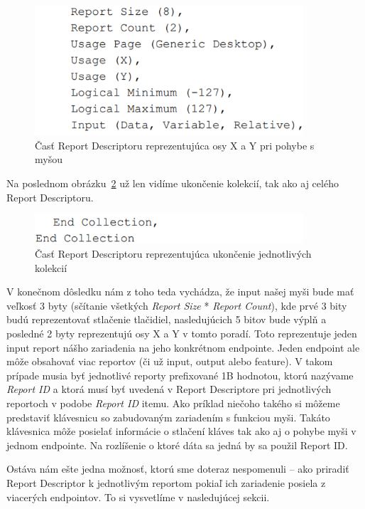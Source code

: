\begin{figure}[!htb]
	\centering
	\includegraphics[width=10cm]{img/kap03_report_desc_axis}
	\caption{Časť Report Descriptoru reprezentujúca osy X a Y pri pohybe s myšou}
	\label{obr:kap3:report_desc_axis}
\end{figure}

Na poslednom obrázku~\ref{obr:kap3:report_desc_end} už len vidíme ukončenie kolekcií, tak ako aj celého Report Descriptoru.

\begin{figure}[!htb]
	\centering
	\includegraphics[width=10cm]{img/kap03_report_desc_end}
	\caption{Časť Report Descriptoru reprezentujúca ukončenie jednotlivých kolekcií}
	\label{obr:kap3:report_desc_end}
\end{figure}

V konečnom dôsledku nám z toho teda vychádza, že input našej myši bude mať veľkosť 3 byty (sčítanie všetkých \textit{Report Size} * \textit{Report Count}), kde prvé 3 bity budú reprezentovať stlačenie tlačidiel, nasledujúcich 5 bitov bude výplň a posledné 2 byty reprezentujú osy X a Y v tomto poradí. Toto reprezentuje jeden input report nášho zariadenia na jeho konkrétnom endpointe. Jeden endpoint ale môže obsahovať viac reportov (či už input, output alebo feature). V takom prípade musia byť jednotlivé reporty prefixované 1B hodnotou, ktorú nazývame \textit{Report ID} a ktorá musí byť uvedená v Report Descriptore pri jednotlivých reportoch v podobe \textit{Report ID} itemu. Ako príklad niečoho takého si môžeme predstaviť klávesnicu so zabudovaným zariadením s funkciou myši. Takáto klávesnica môže posielať informácie o stlačení kláves tak ako aj o pohybe myši v jednom endpointe. Na rozlíšenie o ktoré dáta sa jedná by sa použil Report ID.

Ostáva nám ešte jedna možnosť, ktorú sme doteraz nespomenuli -- ako priradiť Report Descriptor k jednotlivým reportom pokiaľ ich zariadenie posiela z viacerých endpointov. To si vysvetlíme v nasledujúcej sekcii.


